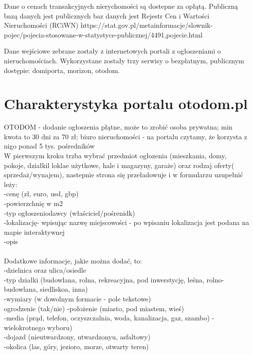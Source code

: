 \documentclass[a4paper,12pt,twoside,openany]{report}
\begin{document}
Dane o cenach transakcyjnych nierychomości są dostepne za opłątą. Publiczną bazą danych jest publicznych baz danych jest Rejestr Cen i Wartości Nieruchomości (RCiWN) 
https://stat.gov.pl/metainformacje/slownik-pojec/pojecia-stosowane-w-statystyce-publicznej/4491,pojecie.html

Dane wejściowe zebrane zostały z internetowych portali z ogłoszeniami o nieruchomościach. Wykorzystane zostały trzy serwisy o bezpłatnym, publicznym dostępie: domiporta, morizon, otodom.

\section{Charakterystyka portalu otodom.pl}
OTODOM - dodanie ogłoszenia płątne, może to zrobić osoba prywatna; min kwota to 30 dni za 70 zł; biuro nieruchomości - na portalu czytamy, że korzysta z nigo ponad 5 tys. pośredników \cite{otodom_o_nas}\\

W pierwszym kroku trzba wybrać przedmiot ogłozenia (mieszkania, domy, pokoje, działkil loklae użytkowe, hale i magazyny, garaże) oraz rodzaj oferty( sprzedaż/wynajem), nastepnie strona się przeładowuje i w formularzu uzupełnić leży:\\
-cenę (zł, euro, usd, gbp)\\
-powierzchnię w m2\\
-typ ogłoszeniodawcy (właściciel/pośrenidk)\\
-lokalizację- wpisując nazwę miejscowości - po wpisaniu lokalizacja jest podana na mapie interaktywnej\\
-opis\\
\\
Dodatkowe informacje, jakie można dodać, to:\\
-dzielnica oraz ulica/osiedle\\
-typ działki (budowlana, rolna, rekreacyjna, pod inwerstycję, leśna, rolno-budowlana, siedliskoa, inna)\\
-wymiary (w dowolnym formacie - pole tekstowe)\\
ogrodzenie (tak/nie)
-położenie (miasto, pod miastem, wieś)\\
-media (prąd, telefon, oczyszczalnia, woda, kanalizacja, gaz, szambo) - wielokrotnego wyboru)\\
-dojazd (nieutwardzony, utwardzonyu, asfaltowy)\\
-okolica (las, góry, jezioro, morze, otwarty teren)\\
\end{document}
